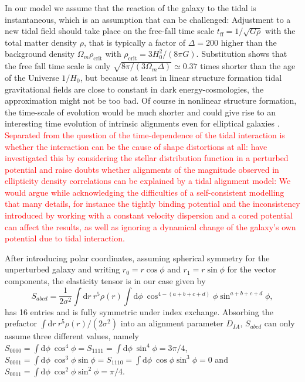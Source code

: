 \documentclass[a4paper,fleqn,usenatbib]{mnras}
\newcommand\spirou[1]{\textcolor{red}{#1}}
\newcommand{\dd}{\mathrm{d}}
\begin{document}
In our model we assume that the reaction of the galaxy to the tidal is instantaneous, which is an assumption that can be challenged: Adjustment to a new tidal field should take place on the free-fall time scale $t_\mathrm{ff} = 1/\sqrt{G\rho}$ with the total matter density $\rho$, that is typically a factor of $\Delta = 200$ higher than the background density $\Omega_m\rho_\mathrm{crit}$ with $\rho_\mathrm{crit} = 3H_0^2/(8\pi G)$. Substitution shows that the free fall time scale is only $\sqrt{8\pi/(3\Omega_m\Delta)}\simeq 0.37$ times shorter than the age of the Universe $1/H_0$, but because at least in linear structure formation tidal gravitational fields are close to constant in dark energy-cosmologies, the approximation might not be too bad. Of course in nonlinear structure formation, the time-scale of evolution would be much shorter and could give rise to an interesting time evolution of intrinsic alignments even for elliptical galaxies \citep{lee_nonlinear_2007, schafer_galactic_2012, schmitz_time_2018}. \spirou{Separated from the question of the time-dependence of the tidal interaction is whether the interaction can be the cause of shape distortions at all: \citep{camelio_origin_2015} have investigated this by considering the stellar distribution function in a perturbed potential and raise doubts whether alignments of the magnitude observed in ellipticity density correlations can be explained by a tidal alignment model: We would argue while acknowledging the difficulties of a self-consistent modelling that many details, for instance the tightly binding potential and the inconsistency introduced by working with a constant velocity dispersion and a cored potential can affect the results, as well as ignoring a dynamical change of the galaxy's own potential due to tidal interaction.}

After introducing polar coordinates, assuming spherical symmetry for the unperturbed galaxy and writing $r_0=r\cos\phi$ and $r_1=r\sin\phi$ for the vector components, the elasticity tensor is in our case given by
\begin{equation}
S_{abcd} = 
\frac{1}{2\sigma^2}\int\dd r\:r^5\rho(r)\int\dd\phi\:\cos^{4-(a+b+c+d)}\phi\sin^{a+b+c+d}\phi,
\end{equation}
has 16 entries and is fully symmetric under index exchange. Absorbing the prefactor $\int\dd r\:r^5\rho(r)/(2\sigma^2)$ into an alignment parameter $D_{IA}$, $S_{abcd}$ can only assume three different values, namely $S_{0000} = \int\dd\phi\:\cos^4\phi = S_{1111} = \int\dd\phi\:\sin^4\phi = 3\pi/4$, $S_{0001} = \int\dd\phi\:\cos^3\phi\sin\phi = S_{1110} = \int\dd\phi\:\cos\phi\sin^3\phi = 0$ and $S_{0011} = \int\dd\phi\:\cos^2\phi\sin^2\phi = \pi/4$.
\end{document}
